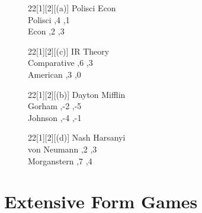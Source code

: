 \documentclass{article}
\begin{document}
\begin{figure}[h!]
\begin{center}
\begin{footnotesize}
\begin{game}{2}{2}[1][2][(a)]
        \> Polisci \> Econ \\
Polisci ,4     ,1  \\
Econ    ,2     ,3  \\
\end{game}\hspace{.5in}
\begin{game}{2}{2}[1][2][(c)]
             \> IR   \> Theory   \\
Comparative  ,6  ,3      \\
American     ,3  ,0      \\
\end{game}
\end{footnotesize}
\end{center}
\end{figure}
\vspace{-.3in}
\begin{figure}[h!]
\begin{center}
\begin{footnotesize}
\begin{game}{2}{2}[1][2][(b)]
        \> Dayton \> Mifflin \\
Gorham  ,-2  ,-5   \\
Johnson ,-4  ,-1   \\
\end{game}\hspace{.5in}
\begin{game}{2}{2}[1][2][(d)]
             \> Nash \> Harsanyi \\
von Neumann  ,2  ,3      \\
Morganstern  ,7  ,4      \\
\end{game}
\end{footnotesize}
\end{center}
\end{figure}




\section{Extensive Form Games}
\end{document}
